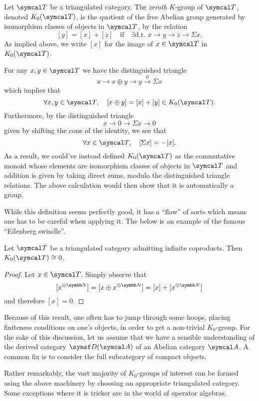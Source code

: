 \begin{definition}
	Let \(\calT\) be a triangulated category. The \emph{zeroth} \(K\)-group of \(\calT\), denoted \(K_0(\calT)\), is the quotient of the free Abelian group
	generated by isomorphism classes of objects in \(\calT\), by the relation
	\[ [y] = [x] + [z] \quad\text{if}\quad \exists\text{d.t. } x\to y\to z \to \Sigma x.  \]
	As implied above, we write \([x]\) for the image of \(x\in\calT\) in \(K_0(\calT)\).
\end{definition}
\begin{remark}
	For any \(x,y\in\calT\) we have the distinguished triangle
	\[ x \to x\oplus y \to y \overset0\to \Sigma x \]
	which implies that
	\[ \forall x,y\in\calT,\quad [x\oplus y] = [x] + [y] \in K_0(\calT). \]
	Furthermore, by the distinguished triangle
	\[ x \to 0 \to \Sigma x \to 0 \]
	given by shifting the cone of the identity, we see that
	\[ \forall x\in\calT,\quad [\Sigma x] = -[x]. \]
	As a result, we could've instead defined \(K_0(\calT)\) as the commutative monoid whose elements are isomorphism classes of objects in \(\calT\) and addition
	is given by taking direct sums, modulo the distinguished triangle relations. The above calculation would then show that it is automatically a group.
\end{remark}

While this definition seems perfectly good, it has a ``flaw'' of sorts which means one has to be careful when applying it. The below is an example of the
famous ``Eilenberg swindle''.

\begin{proposition}
	Let \(\calT\) be a triangulated category admitting infinite coproducts. Then \(K_0(\calT) \cong 0\).
\end{proposition}
\begin{proof}
Let \(x\in\calT\). Simply observe that
\[ [x^{\oplus\N}] = [x\oplus x^{\oplus\N}] = [x] + [x^{\oplus\N}] \]
and therefore \([x] = 0\).
\end{proof}

\begin{remark}
	Because of this result, one often has to jump through some hoops, placing finiteness conditions on one's objects, in order to get a non-trivial \(K_0\)-group. For the sake
	of this discussion, let us assume that we have a sensible understanding of the derived category \(\sfD(\calA)\) of an Abelian category \(\calA\).
	A common fix is to consider the full subcategory of compact objects.

	Rather remarkably, the vast majority of \(K_0\)-groups of interest can be formed using the above machinery by choosing an appropriate triangulated category. Some
	exceptions where it is tricker are in the world of operator algebras.
\end{remark}

